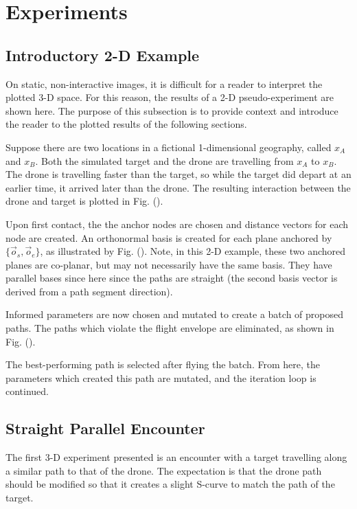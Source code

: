 \documentclass[conf]{new-aiaa}
\begin{document}
\fi




\section{Experiments}

\subsection{Introductory 2-D Example}
On static, non-interactive images, it is difficult for a reader to interpret the plotted 3-D space. For this reason, the results of a 2-D pseudo-experiment are shown here. The purpose of this subsection is to provide context and introduce the reader to the plotted results of the following sections.

Suppose there are two locations in a fictional 1-dimensional geography, called $x_A$ and $x_B$. Both the simulated target and the drone are travelling from $x_A$ to $x_B$. The drone is travelling faster than the target, so while the target did depart at an earlier time, it arrived later than the drone. The resulting interaction between the drone and target is plotted in Fig. ().

Upon first contact, the the anchor nodes are chosen and distance vectors for each node are created. An orthonormal basis is created for each plane anchored by $\{\vec{o}_s, \vec{o}_e\}$, as illustrated by Fig. (). Note, in this 2-D example, these two anchored planes are co-planar, but may not necessarily have the same basis. They have parallel bases since here since the paths are straight (the second basis vector is derived from a path segment direction).

Informed parameters are now chosen and mutated to create a batch of proposed paths. The paths which violate the flight envelope are eliminated, as shown in Fig. ().

The best-performing path is selected after flying the batch. From here, the parameters which created this path are mutated, and the iteration loop is continued.

\subsection{Straight Parallel Encounter}
The first 3-D experiment presented is an encounter with a target travelling along a similar path to that of the drone. The expectation is that the drone path should be modified so that it creates a slight S-curve to match the path of the target.
\end{document}
